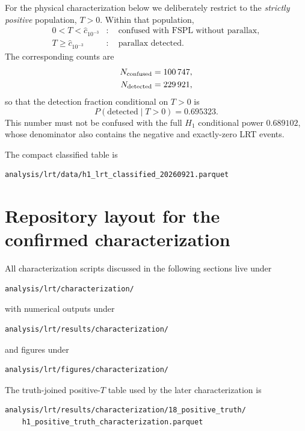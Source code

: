 \documentclass[11pt,a4paper]{article}
\newcommand{\Halt}{H_1}
\begin{document}
For the physical characterization below we deliberately restrict to the
\emph{strictly positive} population, $T>0$.  Within that population,
\begin{align}
    0<T<\widehat c_{10^{-3}}
    &: \quad \text{confused with FSPL without parallax},\\
    T\ge \widehat c_{10^{-3}}
    &: \quad \text{parallax detected}.
\end{align}
The corresponding counts are
\begin{align}
    N_{\rm confused} &= 100\,747,\\
    N_{\rm detected} &= 229\,921,
\end{align}
so that the detection fraction conditional on $T>0$ is
\begin{equation}
    P(\mathrm{detected}\mid T>0)=0.695323.
\end{equation}
This number must not be confused with the full $\Halt$ conditional power
$0.689102$, whose denominator also contains the negative and exactly-zero
LRT events.

The compact classified table is
\begin{verbatim}
analysis/lrt/data/h1_lrt_classified_20260921.parquet
\end{verbatim}

\section{Repository layout for the confirmed characterization}

All characterization scripts discussed in the following sections live under
\begin{verbatim}
analysis/lrt/characterization/
\end{verbatim}
with numerical outputs under
\begin{verbatim}
analysis/lrt/results/characterization/
\end{verbatim}
and figures under
\begin{verbatim}
analysis/lrt/figures/characterization/
\end{verbatim}

The truth-joined positive-$T$ table used by the later characterization is
\begin{verbatim}
analysis/lrt/results/characterization/18_positive_truth/
    h1_positive_truth_characterization.parquet
\end{verbatim}
\end{document}

